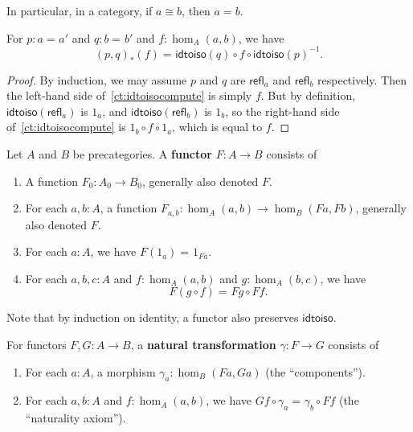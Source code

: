 \documentclass[10pt,a4paper]{article}
\providecommand{\index}[1]{}
\newcommand{\define}[1]{\textbf{#1}}
\newcommand{\id}[3][]{\ensuremath{#2 =_{#1} #3}\xspace}
\newcommand{\refl}[1]{\ensuremath{\mathsf{refl}_{#1}}\xspace}
\newcommand{\trans}[2]{\ensuremath{{#1}_{*}\mathopen{}\left({#2}\right)\mathclose{}}\xspace}
\newcommand{\inv}[1]{{#1}^{-1}}
\newcommand{\idtoiso}{\ensuremath{\mathsf{idtoiso}}\xspace}
\theoremstyle{definition}
\theoremstyle{remark}
\numberwithin{equation}{section}
\newcommand{\indexdef}[1]{\index{#1|defstyle}}   %
\newcommand{\indexsee}[2]{\index{#1|see{#2}}}    %
\begin{document}
In particular, in a category, if $a\cong b$, then $a=b$.

\begin{lem}\label{ct:idtoiso-trans}
  For $p:\id a a'$ and $q:\id b b'$ and $f:\hom_A(a,b)$, we have
  \begin{equation}\label{ct:idtoisocompute}
    \id{\trans{(p,q)}{f}}
    {\idtoiso(q)\circ f \circ \inv{\idtoiso(p)}}.
  \end{equation}
\end{lem}
\begin{proof}
  By induction, we may assume $p$ and $q$ are $\refl a$ and $\refl b$ respectively.
Then the left-hand side of~\eqref{ct:idtoisocompute} is simply $f$.
  But by definition, $\idtoiso(\refl a)$ is $1_a$, and $\idtoiso(\refl b)$ is $1_b$, so the right-hand side of~\eqref{ct:idtoisocompute} is $1_b\circ f\circ 1_a$, which is equal to $f$.
\end{proof}

\begin{defn}\label{ct:functor}
  Let $A$ and $B$ be precategories.
  A \define{functor}
  \indexdef{functor}%
  $F:A\to B$ consists of
  \begin{enumerate}
  \item A function $F_0:A_0\to B_0$, generally also denoted $F$.
  \item For each $a,b:A$, a function $F_{a,b}:\hom_A(a,b) \to \hom_B(Fa,Fb)$, generally also denoted $F$.
  \item For each $a:A$, we have $\id{F(1_a)}{1_{Fa}}$.
  \item For each $a,b,c:A$ and $f:\hom_A(a,b)$ and $g:\hom_A(b,c)$, we have
    \[\id{F(g\circ f)}{Fg\circ Ff}.\]\label{ct:functor:comp}
  \end{enumerate}
\end{defn}

Note that by induction on identity, a functor also preserves \idtoiso.

\begin{defn}\label{ct:nattrans}
  For functors $F,G:A\to B$, a \define{natural transformation}
  \indexdef{natural!transformation}%
  \indexsee{transformation!natural}{natural transformation}%
  $\gamma:F\to G$ consists of
  \begin{enumerate}
  \item For each $a:A$, a morphism $\gamma_a:\hom_B(Fa,Ga)$ (the ``components'').
  \item For each $a,b:A$ and $f:\hom_A(a,b)$, we have $\id{Gf\circ \gamma_a}{\gamma_b\circ Ff}$ (the ``naturality axiom'').
  \end{enumerate}
\end{defn}
\end{document}
